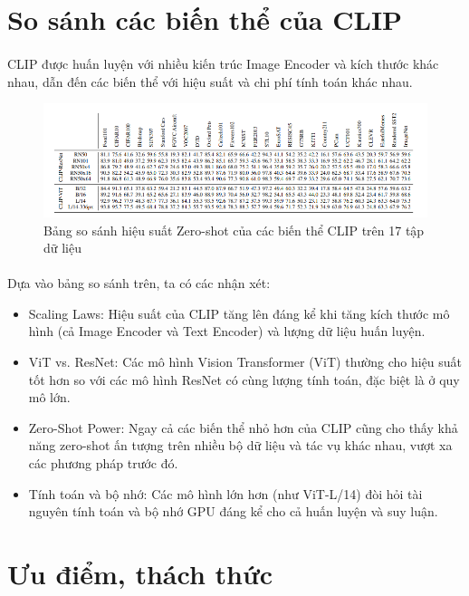 \newpage
\section{So sánh các biến thể của CLIP}

\paragraph{}{CLIP được huấn luyện với nhiều kiến trúc Image Encoder và kích thước khác nhau, dẫn đến các biến thể với hiệu suất và chi phí tính toán khác nhau.}

\begin{figure}[H]
    \centering
    \includegraphics[width=1\linewidth]{img/04-Compare_CLIP.png}
    \caption{Bảng so sánh hiệu suất Zero-shot của các biến thể CLIP trên 17 tập dữ liệu}
\end{figure}

\paragraph{}{Dựa vào bảng so sánh trên, ta có các nhận xét:}
\begin{itemize}
    \item Scaling Laws: Hiệu suất của CLIP tăng lên đáng kể khi tăng kích thước mô hình (cả Image Encoder và Text Encoder) và lượng dữ liệu huấn luyện.
    \item ViT vs. ResNet: Các mô hình Vision Transformer (ViT) thường cho hiệu suất tốt hơn so với các mô hình ResNet có cùng lượng tính toán, đặc biệt là ở quy mô lớn.
    \item Zero-Shot Power: Ngay cả các biến thể nhỏ hơn của CLIP cũng cho thấy khả năng zero-shot ấn tượng trên nhiều bộ dữ liệu và tác vụ khác nhau, vượt xa các phương pháp trước đó.
    \item Tính toán và bộ nhớ: Các mô hình lớn hơn (như ViT-L/14) đòi hỏi tài nguyên tính toán và bộ nhớ GPU đáng kể cho cả huấn luyện và suy luận.
\end{itemize}

\section{Ưu điểm, thách thức}
